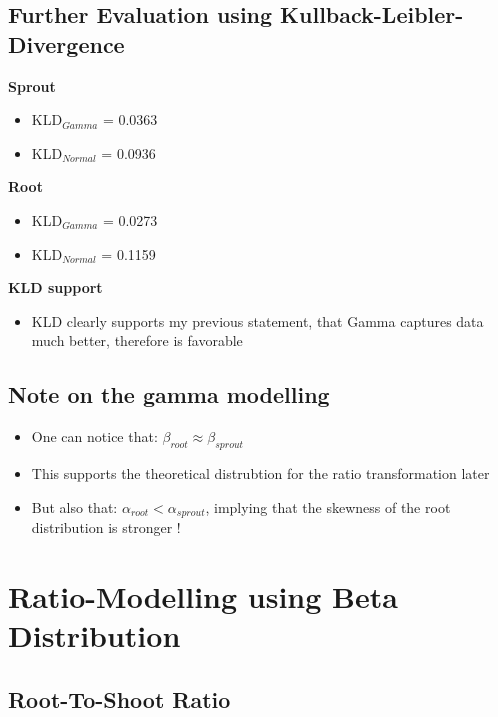 \documentclass{article}
\def\reduceVerticalSpace{\vspace{-0.1cm}}
\def\reduceItemSpace{\itemsep0em }
\begin{document}
		\subsection*{Further Evaluation using Kullback-Leibler-Divergence}
		
			\textbf{Sprout}	
			\begin{itemize}
				\reduceItemSpace
				\reduceVerticalSpace
				\item KLD$_{Gamma}$ = 0.0363
				\item KLD$_{Normal}$ = 0.0936
			\end{itemize}
			
			\textbf{Root}	
			\begin{itemize}
				\reduceItemSpace
				\reduceVerticalSpace
				\item KLD$_{Gamma}$ = 0.0273
				\item KLD$_{Normal}$ = 0.1159
			\end{itemize}
		
			\textbf{KLD support}
			\begin{itemize}
				\item KLD clearly supports my previous statement, that Gamma captures data much better, therefore is favorable
			\end{itemize}
		
		\subsection*{Note on the gamma modelling}
		
		\begin{itemize}
			\reduceVerticalSpace
			\reduceItemSpace
			\item One can notice that:  $\beta_{root} \approx \beta_{sprout}$
			\item This supports the theoretical distrubtion for the ratio transformation later
			\item But also that:  $\alpha_{root} < \alpha_{sprout}$, implying that the skewness of the root distribution is stronger !
		\end{itemize}

	\section{Ratio-Modelling using Beta Distribution}
	
		\subsection*{Root-To-Shoot Ratio}
			
\end{document}
